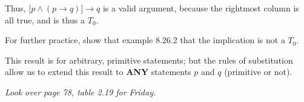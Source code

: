 \documentclass{article}
\begin{document}
Thus, $\lbrack{}p\wedge(p\rightarrow{}q)\rbrack\rightarrow{}q$ is a
valid argument, because the rightmost column is all true, and is thus
a $T_0$.

For further practice, show that example 8.26.2 that the implication is
not a $T_0$.

This result is for arbitrary, primitive statements; but the rules of
substitution allow us to extend this result to \textbf{ANY} statements
$p$ and $q$ (primitive or not).

\textit{Look over page 78, table 2.19 for Friday.}
\end{document}
